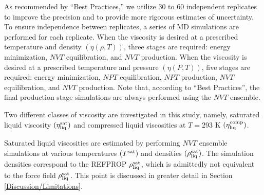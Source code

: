 \documentclass[preprint,review,12pt]{elsarticle}
\begin{document}
	As recommended by ``Best Practices,'' we utilize 30 to 60 independent replicates to improve the precision and to provide more rigorous estimates of uncertainty. To ensure independence between replicates, a series of MD simulations are performed for each replicate. When the viscosity is desired at a prescribed temperature and density $(\eta(\rho,T))$, three stages are required: energy minimization, $NVT$ equilibration, and $NVT$ production. When the viscosity is desired at a prescribed temperature and pressure $(\eta(P,T))$, five stages are required: energy minimization, $NPT$ equilibration, $NPT$ production, $NVT$ equilibration, and $NVT$ production. Note that, according to ``Best Practices'', the final production stage simulations are always performed using the $NVT$ ensemble. 
	
	
	
	
%	
	
	
	Two different classes of viscosity are investigated in this study, namely, saturated liquid viscosity $(\eta_{\rm liq}^{\rm sat})$ and compressed liquid viscosities at $T=293$ K $(\eta_{\rm liq}^{\rm comp})$.
	
	
    Saturated liquid viscosities are estimated by performing $NVT$ ensemble simulations at various temperatures $(T^{\rm sat})$ and densities $(\rho_{\rm liq}^{\rm sat})$. The simulation densities correspond to the REFPROP $\rho_{\rm liq}^{\rm sat}$, which is admittedly not equivalent to the force field $\rho_{\rm liq}^{\rm sat}$. This point is discussed in greater detail in Section \ref{Discussion/Limitations}. 
	
\end{document}
